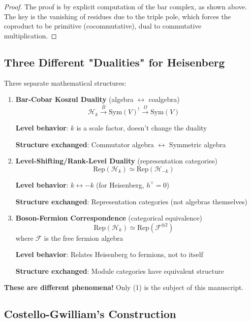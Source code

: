 \begin{proof}
The proof is by explicit computation of the bar complex, as shown above. The key is the 
vanishing of residues due to the triple pole, which forces the coproduct to be primitive 
(cocommutative), dual to commutative multiplication.
\end{proof}

\subsection{Three Different "Dualities" for Heisenberg}

Three separate mathematical structures:

\begin{enumerate}
\item \textbf{Bar-Cobar Koszul Duality} (algebra $\leftrightarrow$ coalgebra)
   $$\mathcal{H}_k \xrightarrow{\bar{B}} \text{Sym}(V)^! \xrightarrow{\Omega} \text{Sym}(V)$$
   
   \textbf{Level behavior}: $k$ is a scale factor, doesn't change the duality
   
   \textbf{Structure exchanged}: Commutator algebra $\leftrightarrow$ Symmetric algebra

\item \textbf{Level-Shifting/Rank-Level Duality} (representation categories)
   $$\text{Rep}(\mathcal{H}_k) \simeq \text{Rep}(\mathcal{H}_{-k})$$
   
   \textbf{Level behavior}: $k \leftrightarrow -k$ (for Heisenberg, $h^{\vee} = 0$)
   
   \textbf{Structure exchanged}: Representation categories (not algebras themselves)

\item \textbf{Boson-Fermion Correspondence} (categorical equivalence)
   $$\text{Rep}(\mathcal{H}_k) \simeq \text{Rep}(\mathcal{F}^{\otimes 2})$$
   where $\mathcal{F}$ is the free fermion algebra
   
   \textbf{Level behavior}: Relates Heisenberg to fermions, not to itself
   
   \textbf{Structure exchanged}: Module categories have equivalent structure
\end{enumerate}

\textbf{These are different phenomena!} Only (1) is the subject of this manuscript.

\subsection{Costello-Gwilliam's Construction}

